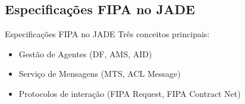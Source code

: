 \subsection{Especificações FIPA no JADE}
\begin{frame}{Especificações FIPA no JADE}
	Três conceitos principais:
		\begin{itemize}
			\item Gestão de Agentes (DF, AMS, AID)
			\item Serviço de Mensagens (MTS, ACL Message)
			\item Protocolos de interação (FIPA Request, FIPA Contract Net)
		\end{itemize}
		
\end{frame}


